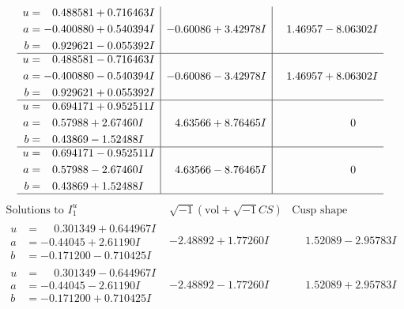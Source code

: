 \documentclass[1p]{elsarticle_modified}
\theoremstyle{definition}
\newcommand{\I}{\sqrt{-1}}
\begin{document}
$$\begin{array}{c|c|c}
\begin{aligned}
u &= \phantom{-}0.488581 + 0.716463 I \\
a &= -0.400880 + 0.540394 I \\
b &= \phantom{-}0.929621 - 0.055392 I\end{aligned}
 & -0.60086 + 3.42978 I & \phantom{-}1.46957 - 8.06302 I \\ \hline\begin{aligned}
u &= \phantom{-}0.488581 - 0.716463 I \\
a &= -0.400880 - 0.540394 I \\
b &= \phantom{-}0.929621 + 0.055392 I\end{aligned}
 & -0.60086 - 3.42978 I & \phantom{-}1.46957 + 8.06302 I \\ \hline\begin{aligned}
u &= \phantom{-}0.694171 + 0.952511 I \\
a &= \phantom{-}0.57988 + 2.67460 I \\
b &= \phantom{-}0.43869 - 1.52488 I\end{aligned}
 & \phantom{-}4.63566 + 8.76465 I & \phantom{-0.000000 } 0 \\ \hline\begin{aligned}
u &= \phantom{-}0.694171 - 0.952511 I \\
a &= \phantom{-}0.57988 - 2.67460 I \\
b &= \phantom{-}0.43869 + 1.52488 I\end{aligned}
 & \phantom{-}4.63566 - 8.76465 I & \phantom{-0.000000 } 0\\
 \hline 
 \end{array}$$\newpage$$\begin{array}{c|c|c}  
\text{Solutions to }I^u_{1}& \I (\text{vol} + \sqrt{-1}CS) & \text{Cusp shape}\\
 \hline 
\begin{aligned}
u &= \phantom{-}0.301349 + 0.644967 I \\
a &= -0.44045 + 2.61190 I \\
b &= -0.171200 - 0.710425 I\end{aligned}
 & -2.48892 + 1.77260 I & \phantom{-}1.52089 - 2.95783 I \\ \hline\begin{aligned}
u &= \phantom{-}0.301349 - 0.644967 I \\
a &= -0.44045 - 2.61190 I \\
b &= -0.171200 + 0.710425 I\end{aligned}
 & -2.48892 - 1.77260 I & \phantom{-}1.52089 + 2.95783 I \\ \hline\begin{aligned}

\end{aligned}
\end{array}$$
\end{document}
